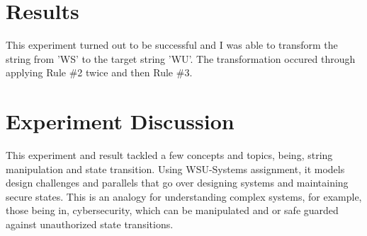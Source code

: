 \documentclass{article}
\begin{document}
\section{Results}
This experiment turned out to be successful and I was able to transform the string from 'WS' to the target string 'WU'. The transformation occured through applying Rule \#2 twice and then Rule \#3. 

\section{Experiment Discussion}
This experiment and result tackled a few concepts and topics, being, string manipulation and state transition.  Using WSU-Systems assignment, it models design challenges and parallels that go over designing systems and maintaining secure states. This is an analogy for understanding complex systems, for example, those being in, cybersecurity, which can be manipulated and or safe guarded against unauthorized state transitions. 
\end{document}
